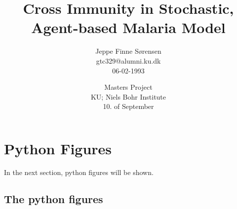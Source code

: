 \documentclass[a4paper,11pt]{report} %
\numberwithin{equation}{section}
\begin{document}
\printlength{\textwidth}

\title{Cross Immunity in Stochastic, Agent-based Malaria Model}
\author{Jeppe Finne Sørensen \\ gtc329@alumni.ku.dk \\ 06-02-1993}
\date{Masters Project \\ KU; Niels Bohr Institute \\ 10. of September}

\maketitle
\thispagestyle{empty}

\newpage	

\chapter{Python Figures}

In the next section, python figures will be shown.

\section{The python figures}
\end{document}
